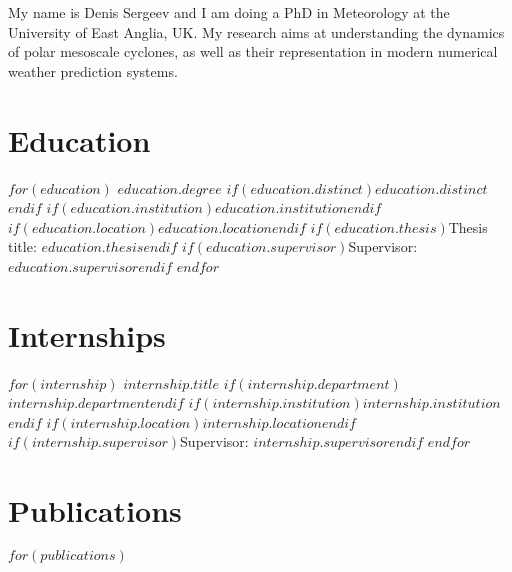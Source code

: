 \documentclass[]{deedy-resume-openfont}
\begin{document}
\lastupdated

\begin{minipage}[t]{\textwidth}
My name is Denis Sergeev and I am doing a PhD in Meteorology at the University of East Anglia, UK. My research aims at understanding the dynamics of polar mesoscale cyclones, as well as their representation in modern numerical weather prediction systems.
\end{minipage}
\sectionsep

\section{Education}
$for(education)$
%
{$education.degree$}%
{$if(education.distinct)$$education.distinct$$endif$}%
{$if(education.institution)$\emph{$education.institution$}$endif$}%
{$if(education.location)$$education.location$$endif$}%
{$if(education.thesis)$Thesis title: \textbf{$education.thesis$}$endif$}%
{$if(education.supervisor)$Supervisor: $education.supervisor$$endif$}
$endfor$
\sectionsep
\section{Internships}
$for(internship)$
%
{$internship.title$}%
{$if(internship.department)$$internship.department$$endif$}%
{}%
{$if(internship.institution)$\emph{$internship.institution$}$endif$}%
{$if(internship.location)$$internship.location$$endif$}%
{$if(internship.supervisor)$Supervisor: $internship.supervisor$$endif$}%
{}%
$endfor$
\sectionsep
\section{Publications}
$for(publications)$
\end{document}
